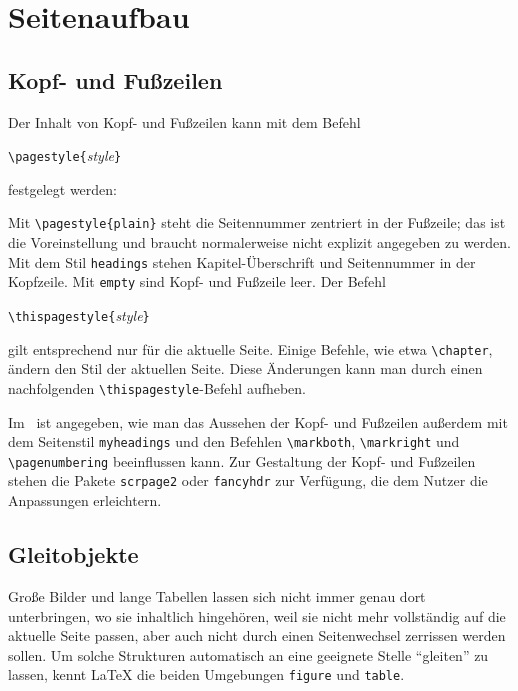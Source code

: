 


\section{Seitenaufbau}

\subsection{Kopf- und Fußzeilen} 
Der Inhalt von Kopf- und  Fußzeilen kann mit dem Befehl
\begin{beispiel}
\lstinline|\pagestyle{|\textit{style}\lstinline|}|
\end{beispiel}
festgelegt werden:
 
Mit \lstinline|\pagestyle{plain}| steht
die Seitennummer zentriert in der Fußzeile; 
das ist die Voreinstellung und braucht normalerweise nicht explizit 
angegeben zu werden.
Mit dem Stil \texttt{headings} stehen Kapitel-Überschrift und
Seitennummer in der Kopfzeile.
Mit \texttt{empty} sind Kopf- und Fußzeile leer.  Der Befehl
\begin{beispiel}
\lstinline|\thispagestyle{|\textit{style}\lstinline|}|
\end{beispiel}
gilt entsprechend nur für die aktuelle Seite.  Einige Befehle, wie etwa
\lstinline|\chapter|, ändern den Stil der aktuellen Seite.  Diese Änderungen 
kann man durch einen nachfolgenden \lstinline|\thispagestyle|-Befehl aufheben.

Im \manual\ ist angegeben, wie man das Aussehen der Kopf- und Fußzeilen
außerdem mit dem Seitenstil 
\lstinline|myheadings| und den Befehlen
\lstinline|\markboth|,
\lstinline|\markright| und
\lstinline|\pagenumbering|
beeinflussen kann. Zur Gestaltung der Kopf- und Fußzeilen stehen die Pakete \texttt{scrpage2}
oder \texttt{fancyhdr} zur Verfügung, die dem Nutzer die Anpassungen erleichtern.

\subsection{Gleitobjekte} \label{floats}
Große Bilder und lange Tabellen lassen sich nicht immer genau 
dort unterbringen, wo sie inhaltlich hingehören, weil sie nicht mehr 
vollständig auf die aktuelle Seite passen, aber auch nicht durch einen 
Seitenwechsel zerrissen werden sollen.  Um  solche Strukturen automatisch
an eine geeignete Stelle "`gleiten"' zu lassen, kennt \LaTeX{} die beiden 
Umgebungen \texttt{figure} und \texttt{table}.  

